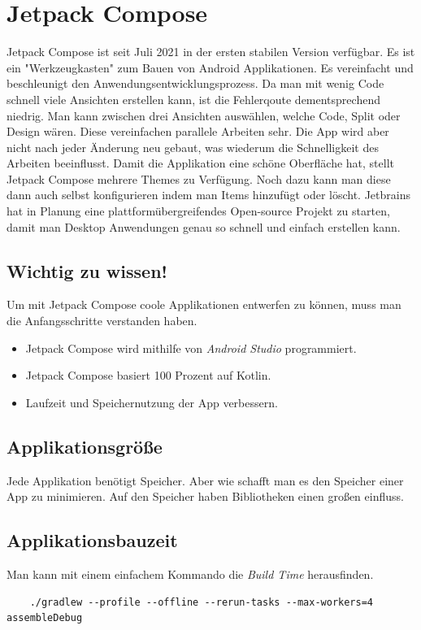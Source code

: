 \section{Jetpack Compose}
\cite{Jetpack-Compose}
\author{Bozidar Spasenovic}
Jetpack Compose ist seit Juli 2021 in der ersten stabilen Version verfügbar. Es ist ein "Werkzeugkasten" zum Bauen von Android Applikationen.
Es vereinfacht und beschleunigt den Anwendungsentwicklungsprozess. Da man mit wenig Code schnell viele Ansichten erstellen kann, ist die Fehlerqoute dementsprechend niedrig.
Man kann zwischen drei Ansichten auswählen, welche Code, Split oder Design wären. Diese vereinfachen parallele Arbeiten sehr. 
Die App wird aber nicht nach jeder Änderung neu gebaut, was wiederum die Schnelligkeit des Arbeiten beeinflusst. Damit die Applikation eine schöne Oberfläche hat, stellt
Jetpack Compose mehrere Themes zu Verfügung. Noch dazu kann man diese dann auch selbst konfigurieren indem man Items hinzufügt oder löscht.
Jetbrains hat in Planung eine plattformübergreifendes Open-source Projekt zu starten, damit man Desktop Anwendungen genau so schnell und einfach erstellen kann. 

\subsection{Wichtig zu wissen!}
\cite{Jetpack-Compose-Docu}
Um mit Jetpack Compose coole Applikationen entwerfen zu können, muss man die Anfangsschritte verstanden haben.

\begin{itemize}
    \item Jetpack Compose wird mithilfe von \textit{Android Studio} programmiert.
    \item Jetpack Compose basiert 100 Prozent auf Kotlin. 
    \item Laufzeit und Speichernutzung der App verbessern.
\end{itemize}

\subsection{Applikationsgröße}
Jede Applikation benötigt Speicher. Aber wie schafft man es den Speicher einer App zu minimieren. 
Auf den Speicher haben Bibliotheken einen großen einfluss. 

\subsection{Applikationsbauzeit}
\cite{Jetpack-Compose-Build}
Man kann mit einem einfachem Kommando die \textit{Build Time} herausfinden.
\begin{lstlisting}
    ./gradlew --profile --offline --rerun-tasks --max-workers=4 assembleDebug
\end{lstlisting}

